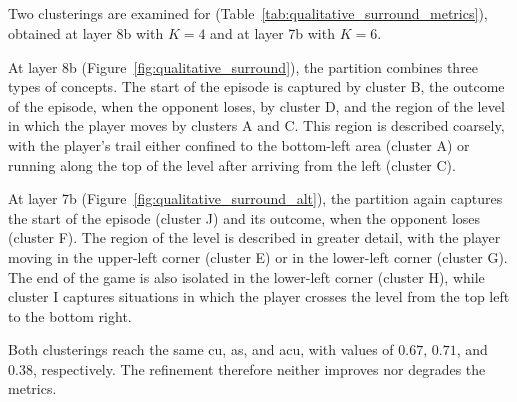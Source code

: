 \newpage
\subsection{\SurroundName}

Two clusterings are examined for \SurroundName (Table~\ref{tab:qualitative_surround_metrics}), obtained at layer 8b with $K=4$ and at layer 7b with $K=6$.

At layer 8b (Figure~\ref{fig:qualitative_surround}), the partition combines three types of concepts.
The start of the episode is captured by cluster B, the outcome of the episode, when the opponent loses, by cluster D, and the region of the level in which the player moves by clusters A and C.
This region is described coarsely, with the player's trail either confined to the bottom-left area (cluster A) or running along the top of the level after arriving from the left (cluster C).

At layer 7b (Figure~\ref{fig:qualitative_surround_alt}), the partition again captures the start of the episode (cluster J) and its outcome, when the opponent loses (cluster F).
The region of the level is described in greater detail, with the player moving in the upper-left corner (cluster E) or in the lower-left corner (cluster G).
The end of the game is also isolated in the lower-left corner (cluster H), while cluster I captures situations in which the player crosses the level from the top left to the bottom right.

Both clusterings reach the same \gls{cu}, \gls{as}, and \gls{acu}, with values of $0.67$, $0.71$, and $0.38$, respectively.
The refinement therefore neither improves nor degrades the metrics.

